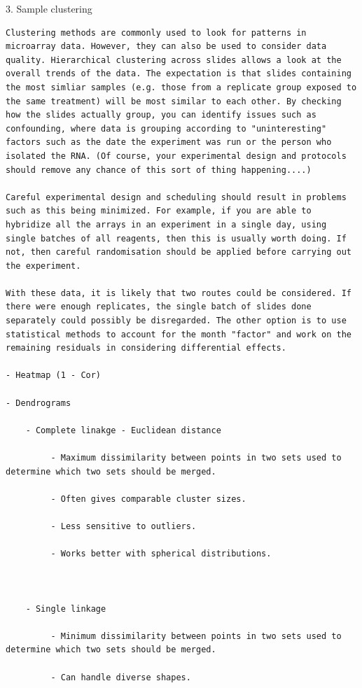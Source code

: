 \documentclass[
]{book}
\begin{document}
3. Sample clustering

\begin{verbatim}
Clustering methods are commonly used to look for patterns in microarray data. However, they can also be used to consider data quality. Hierarchical clustering across slides allows a look at the overall trends of the data. The expectation is that slides containing the most simliar samples (e.g. those from a replicate group exposed to the same treatment) will be most similar to each other. By checking how the slides actually group, you can identify issues such as confounding, where data is grouping according to "uninteresting" factors such as the date the experiment was run or the person who isolated the RNA. (Of course, your experimental design and protocols should remove any chance of this sort of thing happening....)

Careful experimental design and scheduling should result in problems such as this being minimized. For example, if you are able to hybridize all the arrays in an experiment in a single day, using single batches of all reagents, then this is usually worth doing. If not, then careful randomisation should be applied before carrying out the experiment.

With these data, it is likely that two routes could be considered. If there were enough replicates, the single batch of slides done separately could possibly be disregarded. The other option is to use statistical methods to account for the month "factor" and work on the remaining residuals in considering differential effects.

- Heatmap (1 - Cor)

- Dendrograms

    - Complete linakge - Euclidean distance

         - Maximum dissimilarity between points in two sets used to determine which two sets should be merged.

         - Often gives comparable cluster sizes.

         - Less sensitive to outliers.

         - Works better with spherical distributions.



    - Single linkage

         - Minimum dissimilarity between points in two sets used to determine which two sets should be merged.

         - Can handle diverse shapes.


\end{verbatim}
\end{document}
